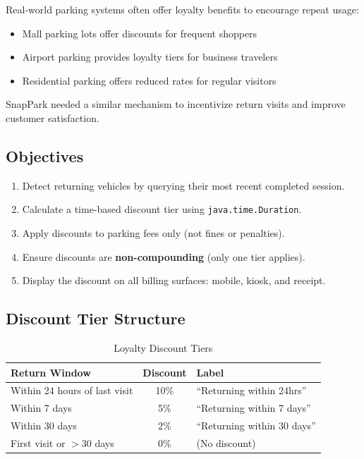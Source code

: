 \documentclass[12pt,a4paper]{article}
\begin{document}
Real-world parking systems often offer loyalty benefits to encourage repeat usage:
\begin{itemize}[noitemsep]
    \item Mall parking lots offer discounts for frequent shoppers
    \item Airport parking provides loyalty tiers for business travelers
    \item Residential parking offers reduced rates for regular visitors
\end{itemize}

SnapPark needed a similar mechanism to incentivize return visits and improve customer satisfaction.

\subsection{Objectives}
\begin{enumerate}[noitemsep]
    \item Detect returning vehicles by querying their most recent completed session.
    \item Calculate a time-based discount tier using \texttt{java.time.Duration}.
    \item Apply discounts to parking fees only (not fines or penalties).
    \item Ensure discounts are \textbf{non-compounding} (only one tier applies).
    \item Display the discount on all billing surfaces: mobile, kiosk, and receipt.
\end{enumerate}

\subsection{Discount Tier Structure}

\begin{table}[H]
\centering
\caption{Loyalty Discount Tiers}
\begin{tabular}{|l|c|l|}
\hline
\textbf{Return Window} & \textbf{Discount} & \textbf{Label} \\
\hline
Within 24 hours of last visit & 10\% & ``Returning within 24hrs'' \\
\hline
Within 7 days & 5\% & ``Returning within 7 days'' \\
\hline
Within 30 days & 2\% & ``Returning within 30 days'' \\
\hline
First visit or $>$30 days & 0\% & (No discount) \\
\hline
\end{tabular}
\end{table}
\end{document}
